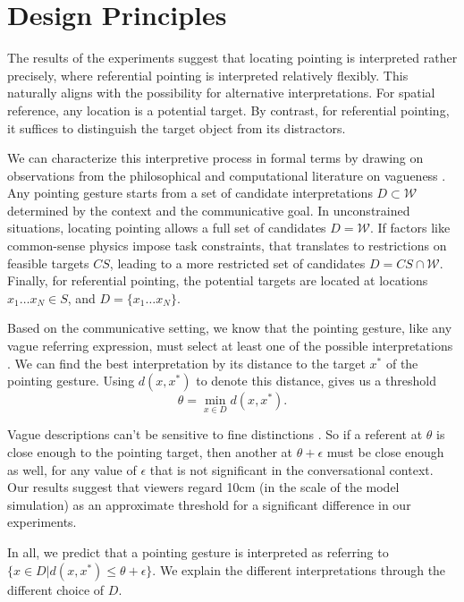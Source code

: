 
\section{Design Principles}

The results of the experiments suggest that locating pointing is interpreted rather precisely, where referential pointing is interpreted relatively flexibly.  This naturally aligns with the possibility for alternative interpretations.  For spatial reference, any location is a potential target.  By contrast, for referential pointing, it suffices to distinguish the target object from its distractors.

We can characterize this interpretive process in formal terms by drawing on observations from the philosophical and computational literature on vagueness \cite{devault2004interpreting,graff2000shifting,kyburg2000fitting}.  Any pointing gesture starts from a set of candidate interpretations $D \subset \mathcal{W}$ determined by the context and the communicative goal.  In unconstrained situations, locating pointing allows a full set of candidates $D = \mathcal{W}.$  If factors like common-sense physics impose task constraints, that translates to restrictions on feasible targets $CS$, leading to a more restricted set of candidates $D = CS \cap \mathcal{W}$.  Finally, for referential pointing, the potential targets are located at locations $x_1 \ldots x_N \in S$, and $D = \{ x_1 \ldots x_N \}.$

Based on the communicative setting, we know that the pointing gesture, like any vague referring expression, must select at least one of the possible interpretations \cite{kyburg2000fitting}.  We can find the best interpretation by its distance to the target $x^*$ of the pointing gesture.  Using $d(x,x^*)$ to denote this distance, gives us a threshold $$\theta = \min_{x \in D} d(x, x^*).$$

Vague descriptions can't be sensitive to fine distinctions \cite{graff2000shifting}.  So if a referent at $\theta$ is close enough to the pointing target, then another at $\theta + \epsilon$ must be close enough as well, for any value of $\epsilon$ that is not significant in the conversational context.  Our results suggest that viewers regard 10cm (in the scale of the model simulation) as an approximate threshold for a significant difference in our experiments.

In all, we predict that a pointing gesture is interpreted as referring to $\{x \in D | d(x,x^*) \leq \theta + \epsilon\}.$  We explain the different interpretations through the different choice of $D$.

